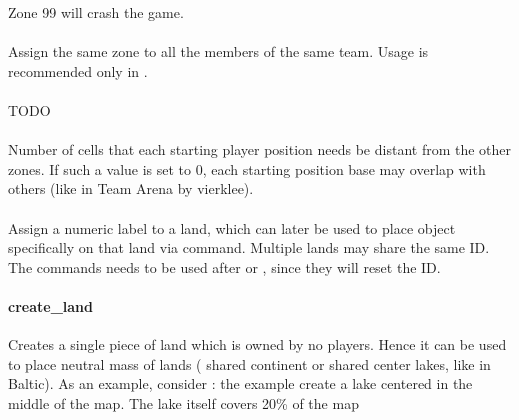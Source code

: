     \begin{attention}
        Zone 99 will crash the game.
    \end{attention}

    \paragraph{}

    Assign the same zone to all the members of the same team. Usage is recommended only in .

    \paragraph{}

    TODO

    \paragraph{}
    Number of cells that each starting player position needs be distant from the other zones. If such a value is set to 0, each starting position base may overlap with others (like in Team Arena by vierklee).

    \paragraph{}

    \paragraph{}

    Assign a numeric label to a land, which can later be used to place object specifically on that land via  command. Multiple lands may share the same ID. The commands needs to be used after  or , since they will reset the ID.

    \paragraph{create\_land}

    Creates a single piece of land which is owned by no players. Hence it can be used to place neutral mass of lands (\eg{} shared continent or shared{} center lakes, like in Baltic).
    As an example, consider : the example create a lake centered in the middle of the map. The lake itself covers 20\% of the map

